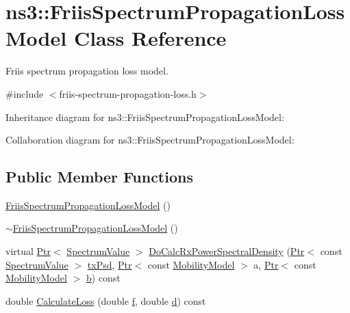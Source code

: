 \hypertarget{classns3_1_1FriisSpectrumPropagationLossModel}{}\section{ns3\+:\+:Friis\+Spectrum\+Propagation\+Loss\+Model Class Reference}
\label{classns3_1_1FriisSpectrumPropagationLossModel}


Friis spectrum propagation loss model.  




{\ttfamily \#include $<$friis-\/spectrum-\/propagation-\/loss.\+h$>$}



Inheritance diagram for ns3\+:\+:Friis\+Spectrum\+Propagation\+Loss\+Model\+:


Collaboration diagram for ns3\+:\+:Friis\+Spectrum\+Propagation\+Loss\+Model\+:
\subsection*{Public Member Functions}
\begin{DoxyCompactItemize}
\item 
\hyperlink{classns3_1_1FriisSpectrumPropagationLossModel_ac24ecc073045b229610cf65e63cc8b52}{Friis\+Spectrum\+Propagation\+Loss\+Model} ()
\item 
\hyperlink{classns3_1_1FriisSpectrumPropagationLossModel_af62e199f4f03470376e1456745ca37cb}{$\sim$\+Friis\+Spectrum\+Propagation\+Loss\+Model} ()
\item 
virtual \hyperlink{classns3_1_1Ptr}{Ptr}$<$ \hyperlink{classns3_1_1SpectrumValue}{Spectrum\+Value} $>$ \hyperlink{classns3_1_1FriisSpectrumPropagationLossModel_a1fafdfdc6666c62333ddac30a10d3873}{Do\+Calc\+Rx\+Power\+Spectral\+Density} (\hyperlink{classns3_1_1Ptr}{Ptr}$<$ const \hyperlink{classns3_1_1SpectrumValue}{Spectrum\+Value} $>$ \hyperlink{lte__link__budget__x2__handover__measures_8m_a684fe3101a5e48a5fcc57cab8dbcd1aa}{tx\+Psd}, \hyperlink{classns3_1_1Ptr}{Ptr}$<$ const \hyperlink{classns3_1_1MobilityModel}{Mobility\+Model} $>$ a, \hyperlink{classns3_1_1Ptr}{Ptr}$<$ const \hyperlink{classns3_1_1MobilityModel}{Mobility\+Model} $>$ \hyperlink{lte__pathloss_8m_a21ad0bd836b90d08f4cf640b4c298e7c}{b}) const 
\item 
double \hyperlink{classns3_1_1FriisSpectrumPropagationLossModel_afee8e44bc6acd7c8dafd6a8df9688ea7}{Calculate\+Loss} (double \hyperlink{80211b_8c_ae7ffc1a8f84fa47a0812b2f2b9627132}{f}, double \hyperlink{lte__pathloss_8m_a1aabac6d068eef6a7bad3fdf50a05cc8}{d}) const 
\end{DoxyCompactItemize}
